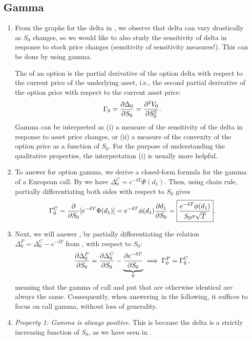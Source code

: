 \subsection{Gamma}
\begin{enumerate}
\item From the graphs for the delta in , we observe that
delta can vary drastically as \(S_0\) changes, so we would like to also study
the sensitivity of delta in response to stock price changes (sensitivity of
sensitivity measures!). This can be done by using gamma.

The  of an option is the partial derivative of the option delta
with respect to the current price of the underlying asset, i.e., the
second partial derivative of the option price with respect to the current asset
price:
\[
\Gamma_0=\pdv{\Delta_0}{S_0}=\pdv[2]{V_0}{S_0}.
\]
Gamma can be interpreted as (i) a measure of the sensitivity of the delta in
response to asset price changes, or (ii) a measure of the convexity of the
option price as a function of \(S_0\). For the purpose of understanding the
qualitative properties, the interpretation (i) is usually more helpful.

\item \label{it:call-gamma-fmla} To answer  for option
gamma, we derive a closed-form formula for the gamma of a European call. By
 we have \(\Delta_0^C=e^{-\delta T}\Phi(d_1)\).
Then, using chain rule, partially differentiating both sides with respect to
\(S_0\) gives
\[
\Gamma_0^C={\pdv{}{S_0}}[e^{-\delta T}\Phi(d_1)]=e^{-\delta T}\phi(d_1)\pdv{d_1}{S_0}
=\boxed{\frac{e^{-\delta T}\phi(d_1)}{S_0\sigma\sqrt{T}}}.
\]

\item \label{it:call-put-gamma-relate} Next, we will answer
, by partially differentiating the relation
\(\Delta_0^P=\Delta_0^C-e^{-\delta T}\) from
, with respect to \(S_0\):
\[
\pdv{\Delta_0^P}{S_0}=\pdv{\Delta_0^C}{S_0}-\underbrace{\pdv{e^{-\delta T}}{S_0}}_{0}
\implies \Gamma^P_0=\Gamma^C_0,
\]
meaning that the gamma of call and put that are otherwise identical are always
the same. Consequently, when answering  in the
following, it suffices to focus on call gamma, without loss of generality.

\item \emph{Property 1: Gamma is always positive.} This is because the delta is
a strictly increasing function of \(S_0\), as we have seen in
.


\end{enumerate}
